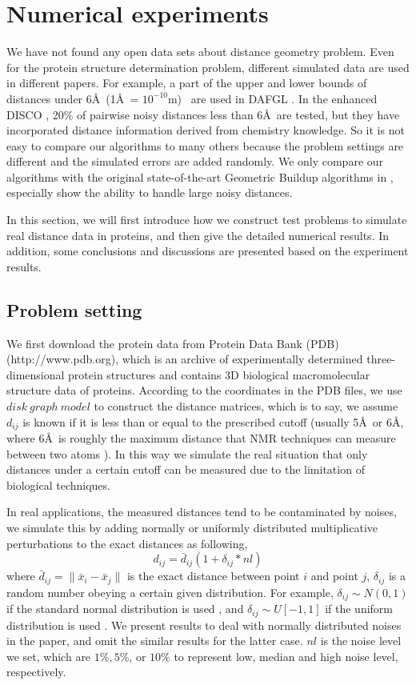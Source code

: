 \documentclass[a4paper,12pt]{article}
\begin{document}
\section{Numerical experiments}\label{sec:num}
We have not found any open data sets about distance geometry problem. Even for the protein structure determination problem, different simulated data are used in different papers. For example, a part of the upper and lower bounds of distances under 6\AA ~(1\AA ~= $10^{-10}$m)~ are used in DAFGL \cite{Biswas2008}. In the enhanced DISCO \cite{Fang2013}, 20\% of pairwise noisy distances less than 6\AA ~are tested, but they have incorporated distance information derived from chemistry knowledge. So it is not easy to compare our algorithms to many others because the problem settings are different and the simulated errors are added randomly. We only compare our algorithms with the original state-of-the-art Geometric Buildup algorithms in \cite{Sit2009}, especially show the ability to handle large noisy distances.

In this section, we will first introduce how we construct test problems to simulate real distance data in proteins, and then give the detailed numerical results. In addition, some conclusions and discussions are presented based on the experiment results.

\subsection{Problem setting}
We first download the protein data from Protein Data Bank (PDB) \cite{Berman2000} (http://www.pdb.org), which is an archive of experimentally determined three-dimensional protein structures and contains 3D biological macromolecular structure data of proteins. According to the coordinates in the PDB files, we use $disk~ graph~ model$ to construct the distance matrices, which is to say, we assume $d_{ij}$ is known if it is less than or equal to the prescribed cutoff (usually 5\AA ~or 6\AA, where 6\AA ~is roughly the maximum distance that NMR techniques can measure between two atoms \cite{Biswas2008}). In this way we simulate the real situation that only distances under a certain cutoff can be measured due to the limitation of biological techniques.

In real applications, the measured distances tend to be contaminated by noises, we simulate this by adding normally or uniformly distributed multiplicative perturbations to the exact distances as following,
$$d_{ij} = \bar{d}_{ij}(1+\delta_{ij}*nl)$$
where $\bar{d}_{ij}=\|\bar{x}_i-\bar{x}_j\|$ is the exact distance between point $i$ and point $j$, $\delta_{ij}$ is a random number obeying a certain given distribution. For example, $\delta_{ij} \sim N(0,1)$ if the standard normal distribution is used \cite{Biswas2008}, and $\delta_{ij} \sim U[-1,1]$ if the uniform distribution is used \cite{Sit2009}. We present results to deal with normally distributed noises in the paper, and omit the similar results for the latter case. $nl$ is the noise level we set, which are $1\%, 5\%$, or $10\%$ to represent low, median and high noise level, respectively.
\end{document}
